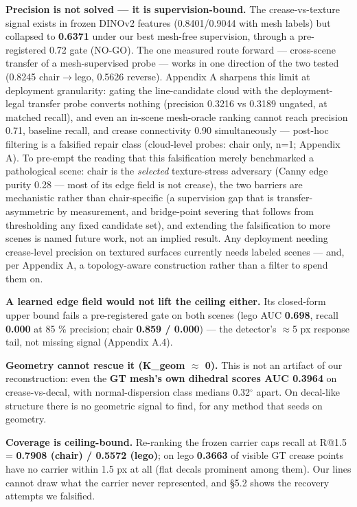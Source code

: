 \textbf{Precision is not solved --- it is supervision-bound.} The crease-vs-texture signal exists
in frozen DINOv2 features (0.8401/0.9044 with mesh labels) but collapsed to \textbf{0.6371}
under our best mesh-free supervision, through a pre-registered 0.72 gate (NO-GO). The one
measured route forward --- cross-scene transfer of a mesh-supervised probe --- works in one
direction of the two tested (0.8245 chair$\rightarrow$lego, 0.5626 reverse). Appendix A sharpens
this limit at deployment granularity: gating the line-candidate cloud with the
deployment-legal transfer probe converts nothing (precision 0.3216 vs 0.3189 ungated, at
matched recall), and even an in-scene mesh-oracle ranking cannot reach precision 0.71,
baseline recall, and crease connectivity 0.90 simultaneously --- post-hoc filtering is a
falsified repair class (cloud-level probes: chair only, n=1; Appendix A). To pre-empt
the reading that this falsification merely benchmarked a pathological scene: chair is the
\emph{selected} texture-stress adversary (Canny edge purity 0.28 --- most of its edge field is
not crease), the two barriers are mechanistic rather than chair-specific (a supervision
gap that is transfer-asymmetric by measurement, and bridge-point severing that follows
from thresholding any fixed candidate set), and extending the falsification to more
scenes is named future work, not an implied result. Any deployment needing crease-level precision on textured
surfaces currently needs labeled scenes --- and, per Appendix A, a topology-aware
construction rather than a filter to spend them on.

\textbf{A learned edge field would not lift the ceiling either.} Its closed-form upper bound
fails a pre-registered gate on both scenes (lego AUC \textbf{0.698}, recall \textbf{0.000} at 85 \%
precision; chair \textbf{0.859 / 0.000}) --- the detector's $\approx$5 px response tail, not missing
signal (Appendix A.4).

\textbf{Geometry cannot rescue it (K\_geom $\approx$ 0).} This is not an artifact of our reconstruction:
even the \textbf{GT mesh's own dihedral scores AUC 0.3964} on crease-vs-decal, with
normal-dispersion class medians 0.32$^{\circ}$ apart. On decal-like structure there is no geometric
signal to find, for any method that seeds on geometry.

\textbf{Coverage is ceiling-bound.} Re-ranking the frozen carrier caps recall at R@1.5 =
\textbf{0.7908 (chair) / 0.5572 (lego)}; on lego \textbf{0.3663} of visible GT crease points have no
carrier within 1.5 px at all (flat decals prominent among them). Our lines cannot draw
what the carrier never represented, and \S5.2 shows the recovery attempts we falsified.

